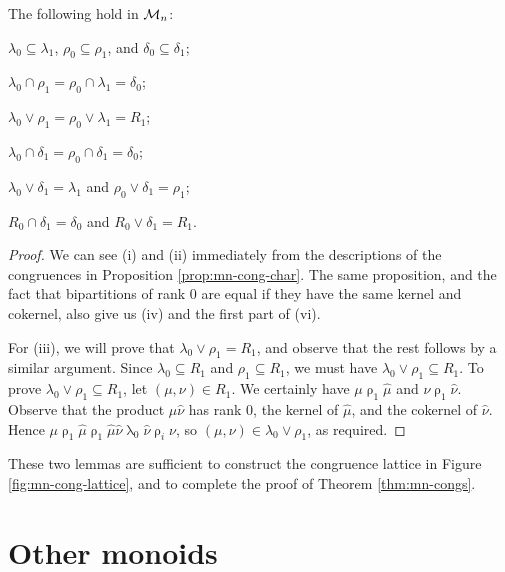 \begin{lemma}
  \label{lem:mn-lattice-inter}
  The following hold in $\mathcal{M}_n$:
  \begin{enumerate}[\rm(i)]
    \begin{multicols}{2}
    \item $\lambda_0 \subseteq \lambda_1$, $\rho_0 \subseteq \rho_1$, and
      $\delta_0 \subseteq \delta_1$;
    \item $\lambda_0 \cap \rho_1 = \rho_0 \cap \lambda_1 = \delta_0$;
    \item $\lambda_0 \vee \rho_1 = \rho_0 \vee \lambda_1 = R_1$;
    \item $\lambda_0 \cap \delta_1 = \rho_0 \cap \delta_1 = \delta_0$;
    \item $\lambda_0 \vee \delta_1 = \lambda_1$ and
      $\rho_0 \vee \delta_1 = \rho_1$;
    \item $R_0 \cap \delta_1 = \delta_0$ and $R_0 \vee \delta_1 = R_1$.
    \end{multicols}
  \end{enumerate}
  \begin{proof}
    We can see (i) and (ii) immediately from the descriptions of the congruences
    in Proposition \ref{prop:mn-cong-char}.  The same proposition, and the fact
    that bipartitions of rank $0$ are equal if they have the same kernel and
    cokernel, also give us (iv) and the first part of (vi).

    For (iii), we will prove that $\lambda_0 \vee \rho_1 = R_1$, and observe
    that the rest follows by a similar argument.  Since
    $\lambda_0 \subseteq R_1$ and $\rho_1 \subseteq R_1$, we must have
    $\lambda_0 \vee \rho_1 \subseteq R_1$.  To prove
    $\lambda_0 \vee \rho_1 \subseteq R_1$, let $(\mu, \nu) \in R_1$.  We
    certainly have $\mu \mathrel\rho_1 \widehat\mu$ and
    $\nu \mathrel\rho_1 \widehat\nu$.  Observe that the product
    $\widehat\mu\widehat\nu$ has rank $0$, the kernel of $\widehat\mu$, and the
    cokernel of $\widehat\nu$.  Hence
    $\mu \mathrel\rho_1 \widehat\mu \mathrel\rho_1 \widehat\mu\widehat\nu
    \mathrel\lambda_0 \widehat\nu \mathrel\rho_i \nu$, so
    $(\mu, \nu) \in \lambda_0 \vee \rho_1$, as required.
  \end{proof}
\end{lemma}

These two lemmas are sufficient to construct the congruence lattice in Figure
\ref{fig:mn-cong-lattice}, and to complete the proof of Theorem
\ref{thm:mn-congs}.

\section{Other monoids}
\label{sec:motzkin-other}
